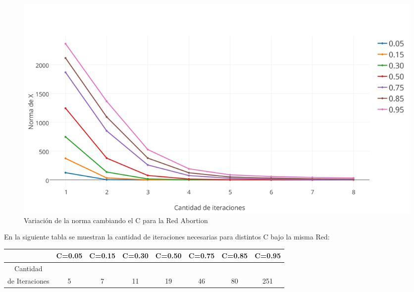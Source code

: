 \documentclass[a4paper]{article}
\begin{document}
\begin{figure}[h!]
  \begin{center}
	\includegraphics[scale=0.50]{imagenes/exp12/abortionPAGERANK.png}
	\caption{Variaci\'on de la norma cambiando el C para la Red Abortion}
	\label{nombreparareferenciar}
  \end{center}
\end{figure}
En la siguiente tabla se muestran la cantidad de iteraciones necesarias para distintos C bajo la misma Red: \\
 \begin{tabular}[c]{|c|c|c|c|c|c|c|c|}
\hline
 & C=0.05 & C=0.15 & C=0.30 & C=0.50 & C=0.75 & C=0.85 & C=0.95 \\
\hline
Cantidad &  & & & & & & \\ 
de Iteraciones & 5 & 7 & 11 & 19 & 46 & 80 & 251 \\
\hline
	\end{tabular}\\\\
\\
\end{document}
